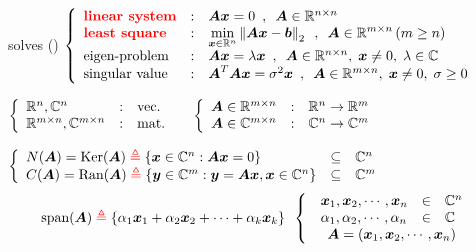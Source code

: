 \documentclass[12pt, leqno]{article}
\begin{document}
 solves ()
$
	\left\{
	\begin{array}{lcl}
		{\color{red} \textbf{linear system}} & : & \boldsymbol{Ax} = 0 \enspace,\enspace \boldsymbol{A} \in
		\mathbb{R}^{n \times n} \\
		{\color{red} \textbf{least square}} & : & \displaystyle
		\min_{\boldsymbol{x}\in\mathbb{R}^n}\left\lVert \boldsymbol{Ax}-\boldsymbol{b} \right\rVert_2 \enspace,\enspace \boldsymbol{A} \in
		\mathbb{R}^{m \times n}\,(m\geq n) \\
		\text{eigen-problem} & : & \boldsymbol{Ax}=\lambda\boldsymbol{x} \enspace,\enspace
		\boldsymbol{A}\in\mathbb{R}^{n \times n},\;\boldsymbol{x}\neq0,\;\lambda\in\mathbb{C}\\
		\text{singular value} & : & \boldsymbol{A}^T\boldsymbol{Ax}=\sigma^2\boldsymbol{x} \enspace,\enspace
		\boldsymbol{A}\in\mathbb{R}^{m \times n},\;\boldsymbol{x}\neq0,\;\sigma\geq0
	\end{array}
	\right.
$

$
	\left\{
	\begin{array}{lcl}
		\fls{R}^n,\fls{C}^n & : & \text{vec.\@} \\
		\fls{R}^{\fts{m}{n}},\fls{C}^{\fts{m}{n}} & : & \text{mat.\@} \\
	\end{array}
	\right. \quad
$ 
$
	\left\{
	\begin{array}{lcl}
		\boldsymbol{A} \in \mathbb{R}^{m \times n} & : & \mathbb{R}^n \to \mathbb{R}^m \\
		\boldsymbol{A} \in \mathbb{C}^{m \times n} & : & \mathbb{C}^n \to \mathbb{C}^m \\
	\end{array}
	\right.
$

$
	\left\{
	\begin{array}{lcl}
		N(\boldsymbol{A}) = \textrm{Ker}(\boldsymbol{A}) \;{\color{red} \boldsymbol{\triangleq}}\; \{\boldsymbol{x}
		\in \mathbb{C}^n:\boldsymbol{Ax}=0\} & \subseteq & \mathbb{C}^n \\
		C(\boldsymbol{A}) = \textrm{Ran}(\boldsymbol{A}) \;{\color{red} \boldsymbol{\triangleq}}\; \{\boldsymbol{y}
		\in \mathbb{C}^m : \boldsymbol{y}=\boldsymbol{Ax},\boldsymbol{x} \in \mathbb{C}^n\}
		& \subseteq & \mathbb{C}^m
	\end{array}
	\right.
$
\[
	\textrm{span}(\boldsymbol{A}) \;{\color{red} \boldsymbol{\triangleq}}\; \{\alpha_1\boldsymbol{x}_1 +
	\alpha_2\boldsymbol{x}_2 + \cdots + \alpha_k\boldsymbol{x}_k\} \enspace
	\left\{
		\begin{array}{c}
			\begin{array}{lcl}
				\boldsymbol{x}_1, \boldsymbol{x}_2, \cdots, \boldsymbol{x}_n & \in & \mathbb{C}^n \\
				\alpha_1, \alpha_2, \cdots, \alpha_n & \in & \mathbb{C} \\
			\end{array} \\
			\boldsymbol{A} = \left( \boldsymbol{x}_1, \boldsymbol{x}_2, \cdots, \boldsymbol{x}_n \right)
		\end{array}
	\right.
\]
\end{document}
